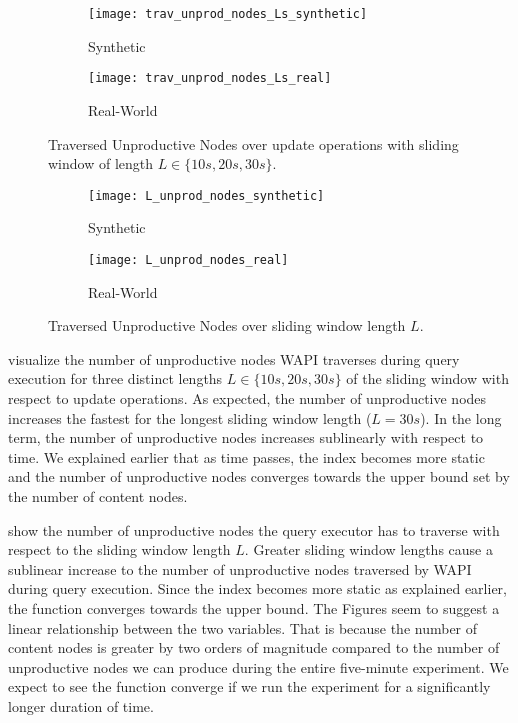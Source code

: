 \documentclass[abstracton,12pt]{scrartcl}
\theoremstyle{definition}
\begin{document}
\begin{figure}[h]
  \centering
  \begin{subfigure}{0.49\linewidth}
    \centering
    \caption{Synthetic}
    \texttt{[image: trav\_unprod\_nodes\_Ls\_synthetic]}
    \label{fig:trav_unprod_nodes_Ls_synthetic}
  \end{subfigure}
  \begin{subfigure}{0.49\linewidth}
    \centering
    \caption{Real-World}
    \texttt{[image: trav\_unprod\_nodes\_Ls\_real]}
    \label{fig:trav_unprod_nodes_Ls_real}
  \end{subfigure}
  \vspace{-0.5cm}
  \caption{Traversed Unproductive Nodes over update operations with sliding 
  window of length $L \in \{10s,20s,30s\}$.}
\end{figure}

\begin{figure}[h]
  \centering
  \begin{subfigure}{0.49\linewidth}
    \centering
    \caption{Synthetic}
    \texttt{[image: L\_unprod\_nodes\_synthetic]}
    \label{fig:L_trav_unprod_nodes_synthetic}
  \end{subfigure}
  \begin{subfigure}{0.49\linewidth}
    \centering
    \caption{Real-World}
    \texttt{[image: L\_unprod\_nodes\_real]}
    \label{fig:L_trav_unprod_nodes_real}
  \end{subfigure}
  \vspace{-0.5cm}
  \caption{Traversed Unproductive Nodes over sliding window length $L$.}
\end{figure}

 visualize
the number of unproductive nodes WAPI traverses during query execution for
three distinct lengths $L \in \{10s,20s,30s\}$ of the sliding window with
respect to update operations. As expected, the number of unproductive nodes
increases the fastest for the longest sliding window length ($L = 30s$).
In the long term,
the number of unproductive nodes increases sublinearly with respect to time.
We explained earlier that as time passes, the index becomes more static
and the number of unproductive nodes converges towards the upper bound
set by the number of content nodes.

 show the
number of unproductive nodes the query executor has to traverse with respect
to the sliding window length $L$. Greater sliding window lengths 
cause a sublinear increase to the number of unproductive nodes traversed 
by WAPI during query execution. Since the index becomes more static 
as explained earlier, the function converges towards the upper bound. 
The Figures seem to suggest a linear relationship
between the two variables. That is because the number of content nodes is greater
by two orders of magnitude compared to the number of unproductive nodes we can
produce during the entire five-minute experiment. We expect to see the function 
converge if we run the experiment for a significantly longer duration of time.
\end{document}
